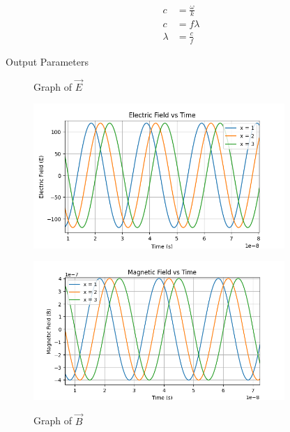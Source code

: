\documentclass[journal,12pt,twocolumn]{IEEEtran}
\theoremstyle{remark}
\begin{document}
\newpage

\begin{align}
    c &= \frac{\omega}{k}\\
    c &= f\lambda\\
    \lambda &= \frac{c}{f}
\end{align}

\begin{flushleft}
    \begin{table}[ht]
        \caption{Output Parameters}
        
        \label{tab:table3.12.8.8}
    \end{table}
\end{flushleft}

\newpage

\renewcommand{\thefigure}{\theenumi}
\renewcommand{\thetable}{\theenumi}

\begin{flushleft}

\begin{figure}[ht]
\renewcommand\thefigure{1}
  \caption{Graph of $\vec{E}$}
  \includegraphics[width=0.85\textwidth]{figs/fig1.png}
  \label{fig:fig1.12.8.8}

    \renewcommand\thefigure{2}
    \caption{Graph of $\vec{B}$}
    \includegraphics[width=0.85\textwidth]{figs/fig2.png}
    \label{fig:fig2.12.8.8}
\end{figure}

\end{flushleft}
\end{document}
